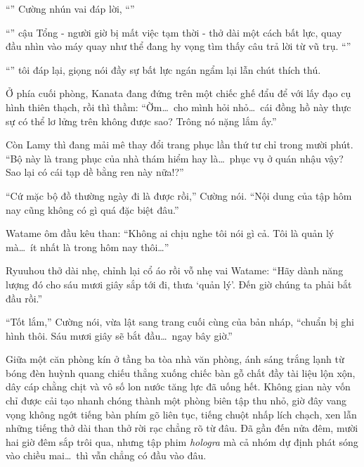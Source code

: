 \documentclass[../main.tex]{subfiles}
\begin{document}
``'' Cường nhún vai đáp lời, ``''

``'' cậu Tổng - người giờ bị mất việc tạm thời - thở dài một cách bất lực, quay đầu nhìn vào máy quay như thể đang hy vọng tìm thấy câu trả lời từ vũ trụ. ``''

``'' tôi đáp lại, giọng nói đầy sự bất lực ngán ngẩm lại lẫn chút thích thú.

Ở phía cuối phòng, Kanata đang đứng trên một chiếc ghế đẩu để với lấy đạo cụ hình thiên thạch, rồi thì thầm: ``Ờm\dots\ cho mình hỏi nhỏ\dots\ cái đồng hồ này thực sự có thể lơ lửng trên không được sao? Trông nó nặng lắm ấy.''

Còn Lamy thì đang mải mê thay đổi trang phục lần thứ tư chỉ trong mười phút. ``Bộ này là trang phục của nhà thám hiểm hay là\dots\ phục vụ ở quán nhậu vậy? Sao lại có cái tạp dề bằng ren này nữa!?''

``Cứ mặc bộ đồ thường ngày đi là được rồi,'' Cường nói. ``Nội dung của tập hôm nay cũng không có gì quá đặc biệt đâu.''

Watame ôm đầu kêu than: ``Không ai chịu nghe tôi nói gì cả. Tôi là quản lý mà\dots\ ít nhất là trong hôm nay thôi\dots''

Ryuuhou thở dài nhẹ, chỉnh lại cổ áo rồi vỗ nhẹ vai Watame: ``Hãy dành năng lượng đó cho sáu mươi giây sắp tới đi, thưa `quản lý'. Đến giờ chúng ta phải bắt đầu rồi.''

``Tốt lắm,'' Cường nói, vừa lật sang trang cuối cùng của bản nháp, ``chuẩn bị ghi hình thôi. Sáu mươi giây sẽ bắt đầu\dots\ ngay bây giờ.''

\il

Giữa một căn phòng kín ở tầng ba tòa nhà văn phòng, ánh sáng trắng lạnh từ bóng đèn huỳnh quang chiếu thẳng xuống chiếc bàn gỗ chất đầy tài liệu lộn xộn, dây cáp chằng chịt và vô số lon nước tăng lực đã uống hết. Không gian này vốn chỉ được cải tạo nhanh chóng thành một phòng biên tập thu nhỏ, giờ đây vang vọng không ngớt tiếng bàn phím gõ liên tục, tiếng chuột nhấp lích chạch, xen lẫn những tiếng thở dài than thở rời rạc chẳng rõ từ đâu. Đã gần đến nửa đêm, mười hai giờ đêm sắp trôi qua, nhưng tập phim \textit{hologra} mà cả nhóm dự định phát sóng vào chiều mai\dots\ thì vẫn chẳng có đầu vào đâu.
\end{document}
